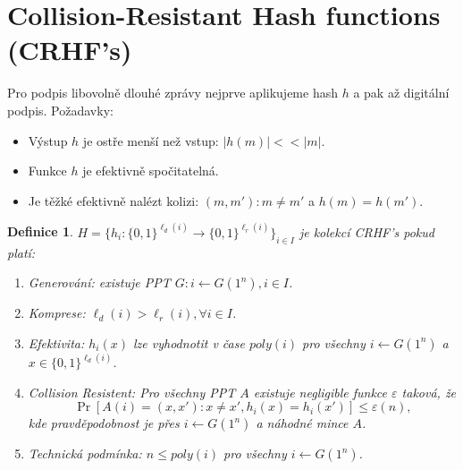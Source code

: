 \documentclass{article}
\newtheorem{definition}{Definice}
\begin{document}

\section{Collision-Resistant Hash functions (CRHF's)}
Pro podpis libovolně dlouhé zprávy nejprve aplikujeme hash $h$ a pak až digitální podpis.
Požadavky:
\begin{itemize}
\item Výstup $h$ je ostře menší než vstup: $|h(m)| << |m|$.
\item Funkce $h$ je efektivně spočitatelná.
\item Je těžké efektivně nalézt kolizi: $(m,m'): m\neq m'$ a $h(m) = h(m')$.
\end{itemize}

\begin{definition}
$H = \bigl\{h_i: \{0,1\}^{\ell_d(i)} \to \{0,1\}^{\ell_r(i)} \bigr\}_{i \in I}$
je \emph{kolekcí CRHF's} pokud platí:
\begin{enumerate}
\item Generování: existuje PPT $G: i \leftarrow G(1^n), i \in I$.
\item Komprese: $\ell_d(i) > \ell_r(i), \forall i \in I$.
\item Efektivita: $h_i(x)$ lze vyhodnotit v čase $\textit{poly}(i)$ pro všechny $i \leftarrow G(1^n)$ a $x \in \{0,1\}^{\ell_d(i)}$.
\item Collision Resistent: Pro všechny PPT $A$ existuje negligible funkce $\varepsilon$ taková, že
\[
\Pr[A(i) = (x,x'): x \neq x', h_i(x) = h_i(x')] \leq \varepsilon(n),
\]
kde pravděpodobnost je přes $i \leftarrow G(1^n)$ a náhodné mince $A$.
\item Technická podmínka: $n \leq \textit{poly}(i)$ pro všechny $i \leftarrow G(1^n)$.
\end{enumerate}
\end{definition}
\end{document}
